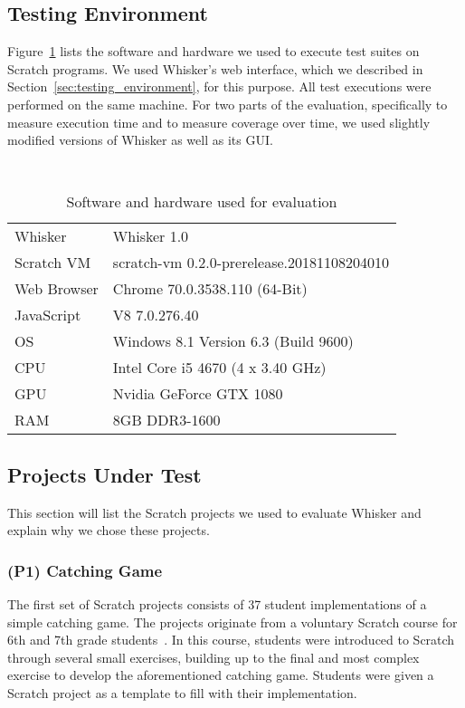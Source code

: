 \subsection{Testing Environment}

Figure~\ref{tab:evaluation_setup} lists the software and hardware we used to execute test suites on Scratch programs.
We used Whisker's web interface, which we described in Section~\ref{sec:testing_environment}, for this purpose.
All test executions were performed on the same machine.
For two parts of the evaluation,
specifically to measure execution time and to measure coverage over time,
we used slightly modified versions of Whisker as well as its GUI.

\begin{table}[htpb]
    \centering
    \scriptsize \tt
    \begin{tabular}{ll}
        \toprule
        Whisker     & Whisker 1.0 \\
        Scratch VM  & scratch-vm 0.2.0-prerelease.20181108204010 \\
        Web Browser & Chrome 70.0.3538.110 (64-Bit) \\
        JavaScript  & V8 7.0.276.40 \\
        OS          & Windows 8.1 Version 6.3 (Build 9600) \\
        CPU         & Intel Core i5 4670 (4 x  3.40 GHz) \\
        GPU         & Nvidia GeForce GTX 1080 \\
        RAM         & 8GB DDR3-1600 \\
        \bottomrule
    \end{tabular}
    \caption{Software and hardware used for evaluation}
    \label{tab:evaluation_setup}
\end{table}

\subsection{Projects Under Test}

This section will list the Scratch projects we used to evaluate Whisker and explain why we chose these projects.

\subsubsection{(P1) Catching Game}

The first set of Scratch projects consists of 37 student implementations of a simple catching game.
The projects originate from a voluntary Scratch course for 6th and 7th grade students~\cite{keller}.
In this course, students were introduced to Scratch through several small exercises,
building up to the final and most complex exercise to develop the aforementioned catching game.
Students were given a Scratch project as a template to fill with their implementation.
\parspace


